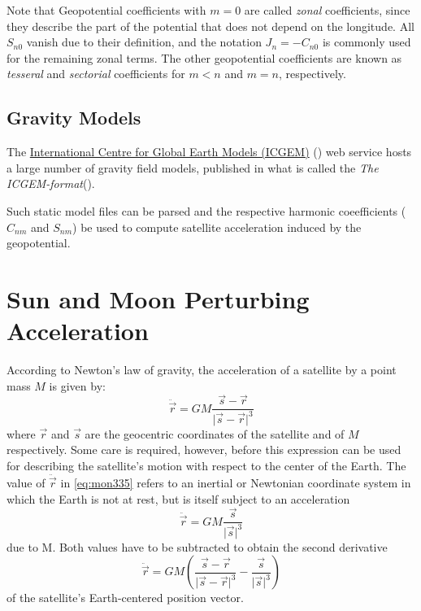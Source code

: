 Note that Geopotential coefficients with \(m=0\) are called  \emph{zonal} coefficients, 
since they describe the part of the potential that does not depend on the longitude. 
All \(S_{n0}\) vanish due to their definition, and the notation \(J_n = -C_{n0}\) 
is commonly used for the remaining zonal terms. The other geopotential coefficients
are known as \emph{tesseral} and \emph{sectorial} coefficients for \(m<n\) and 
\(m = n\), respectively.


\subsection{Gravity Models}
The \href{http://icgem.gfz-potsdam.de/home}{International Centre for Global Earth Models (ICGEM)}  
(\cite{icgempub}) web service hosts a large number of gravity field models, 
published in what is called the \emph{The ICGEM-format}(\cite{ICGEMFormat}). 

Such static model files can be parsed and the respective harmonic coeefficients 
(\(C_{nm}\) and \(S_{nm}\)) be used to compute satellite acceleration induced by 
the geopotential.

\section{Sun and Moon Perturbing Acceleration}
According to Newton's law of gravity, the acceleration of a satellite by a point 
mass \(M\) is given by:
\begin{equation}
    \label{eq:mon335}
    \ddot{\vec{r}} = G M \frac{\vec{s}-\vec{r}}{\lvert \vec{s} - \vec{r} \rvert ^3}
\end{equation}
where \(\vec{r}\) and \(\vec{s}\) are the geocentric coordinates of the satellite 
and of \(M\) respectively. Some care is required, however, before this expression 
can be used for describing the satellite's motion with respect to the center of 
the Earth. The value of \(\ddot{\vec{r}}\) in \ref{eq:mon335} refers to an 
inertial or Newtonian coordinate system in which the Earth is not at rest, but 
is itself subject to an acceleration
\begin{equation}
    \ddot{\vec{r}} = G M \frac{\vec{s}}{\lvert \vec{s} \rvert ^3}
\end{equation}
due to M. Both values have to be subtracted to obtain the second derivative
\begin{equation}
    \label{eq:mon337}
    \ddot{\vec{r}} = G M (\frac{\vec{s}-\vec{r}}{\lvert \vec{s} - \vec{r} \rvert ^3} - \frac{\vec{s}}{\lvert \vec{s} \rvert ^3})
\end{equation}
of the satellite's Earth-centered position vector.

